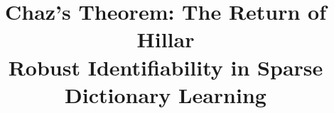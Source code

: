 \documentclass[journal,onecolumn]{IEEEtran}
\begin{document}
%
\title{Chaz's Theorem: The Return of Hillar \\ \LARGE Robust Identifiability in Sparse Dictionary Learning}
%
%
%




% 
%



% 
\end{document}
